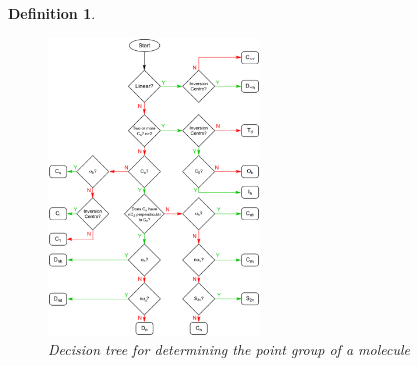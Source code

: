 \documentclass[12pt,letterpaper]{article}
\newtheorem{definition}{Definition}
\begin{document}
\begin{multicols}{2}
\begin{definition}
\begin{figure}[H]
\centering
\includegraphics[width = 0.5\textwidth]{GeneralSources/Point_group_determination_flowchart_v2.png}
\caption{Decision tree for determining the point group of a molecule}
\label{figExScpectroDecisionTree}
\end{figure}

\end{definition}
\end{multicols}
\newpage
\end{document}
